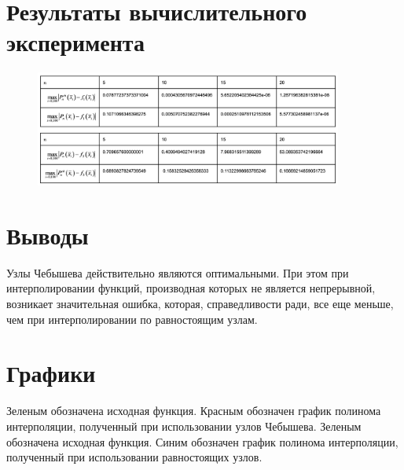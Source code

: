 \documentclass{article}
\begin{document}
\section*{Результаты вычислительного эксперимента}
\begin{figure}[H]
\caption{}
\centering
\includegraphics[width=0.9\textwidth]{table}
\end{figure}
\section*{Выводы}
Узлы Чебышева действительно являются оптимальными. При этом при интерполировании
функций, производная которых не является непрерывной, возникает значительная
ошибка, которая, справедливости ради, все еще меньше, чем при интерполировании
по равностоящим узлам.

\section*{Графики}
Зеленым обозначена исходная функция.
Красным обозначен график полинома интерполяции, полученный при использовании узлов Чебышева.
Зеленым обозначена исходная функция.
Синим обозначен график полинома интерполяции, полученный при использовании равностоящих узлов.
\end{document}
